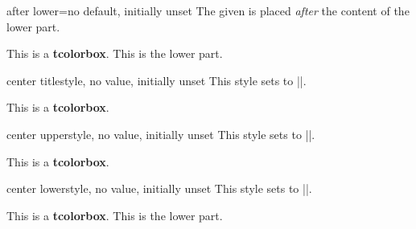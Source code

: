 \begin{docTcbKey}{after lower}{=}{no default, initially unset}
  The given  is placed \emph{after} the content of the lower part.
\begin{dispExample}

\begin{tcolorbox}
This is a \textbf{tcolorbox}.
\tcblower
This is the lower part.
\end{tcolorbox}
\end{dispExample}
\end{docTcbKey}


\clearpage
\begin{docTcbKey}{center title}{}{style, no value, initially unset}
  This style sets  to |\centering|.
\begin{dispExample}

\begin{tcolorbox}[title=My title]
This is a \textbf{tcolorbox}.
\end{tcolorbox}
\end{dispExample}
\end{docTcbKey}


\begin{docTcbKey}{center upper}{}{style, no value, initially unset}
  This style sets  to |\centering|.
\begin{dispExample}

\begin{tcolorbox}[title=My title]
This is a \textbf{tcolorbox}.
\end{tcolorbox}
\end{dispExample}
\end{docTcbKey}


\begin{docTcbKey}{center lower}{}{style, no value, initially unset}
  This style sets  to |\centering|.
\begin{dispExample}

\begin{tcolorbox}[title=My title]
This is a \textbf{tcolorbox}.
\tcblower
This is the lower part.
\end{tcolorbox}
\end{dispExample}
\end{docTcbKey}



